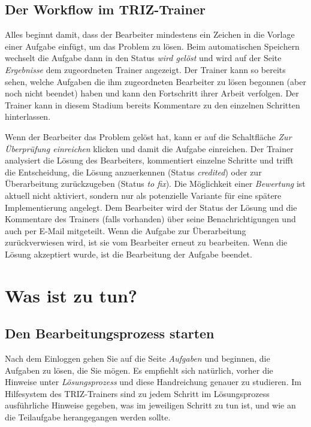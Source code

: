 \documentclass[11pt,a4paper]{article}
\begin{document}
\subsection{Der Workflow im TRIZ-Trainer}

Alles beginnt damit, dass der Bearbeiter mindestens ein Zeichen in die Vorlage
einer Aufgabe einfügt, um das Problem zu lösen. Beim automatischen Speichern
wechselt die Aufgabe dann in den Status \emph{wird gelöst} und wird auf der
Seite \emph{Ergebnisse} dem zugeordneten Trainer angezeigt. Der Trainer kann
so bereits sehen, welche Aufgaben die ihm zugeordneten Bearbeiter zu lösen
begonnen (aber noch nicht beendet) haben und kann den Fortschritt ihrer Arbeit
verfolgen. Der Trainer kann in diesem Stadium bereits Kommentare zu den
einzelnen Schritten hinterlassen.

Wenn der Bearbeiter das Problem gelöst hat, kann er auf die Schaltfläche
\emph{Zur Überprüfung einreichen} klicken und damit die Aufgabe einreichen.
Der Trainer analysiert die Lösung des Bearbeiters, kommentiert einzelne
Schritte und trifft die Entscheidung, die Lösung anzuerkennen (Status
\emph{credited}) oder zur Überarbeitung zurückzugeben (Status \emph{to fix}).
Die Möglichkeit einer \emph{Bewertung} ist aktuell nicht aktiviert, sondern
nur als potenzielle Variante für eine spätere Implementierung angelegt. Dem
Bearbeiter wird der Status der Lösung und die Kommentare des Trainers (falls
vorhanden) über seine Benachrichtigungen und auch per E-Mail mitgeteilt.  Wenn
die Aufgabe zur Überarbeitung zurückverwiesen wird, ist sie vom Bearbeiter
erneut zu bearbeiten. Wenn die Lösung akzeptiert wurde, ist die Bearbeitung
der Aufgabe beendet.

\section{Was ist zu tun?}

\subsection{Den Bearbeitungsprozess starten}

Nach dem Einloggen gehen Sie auf die Seite \emph{Aufgaben} und beginnen, die
Aufgaben zu lösen, die Sie mögen.  Es empfiehlt sich natürlich, vorher die
Hinweise unter \emph{Lösungsprozess} und diese Handreichung genauer zu
studieren.  Im Hilfesystem des TRIZ-Trainers sind zu jedem Schritt im
Lösungsprozess ausführliche Hinweise gegeben, was im jeweiligen Schritt zu tun
ist, und wie an die Teilaufgabe herangegangen werden sollte.
\end{document}
